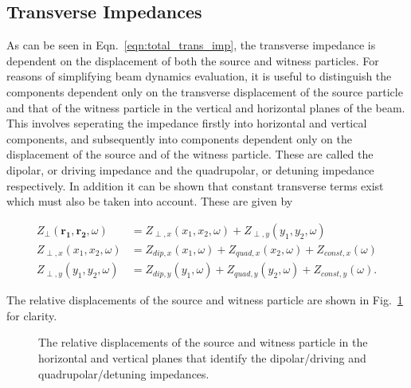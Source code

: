 \subsection{Transverse Impedances}

As can be seen in Eqn.~\ref{eqn:total_trans_imp}, the transverse impedance is dependent on the displacement of both the source and witness particles. For reasons of simplifying beam dynamics evaluation, it is useful to distinguish the components dependent only on the transverse displacement of the source particle and that of the witness particle in the vertical and horizontal planes of the beam. This involves seperating the impedance firstly into horizontal and vertical components, and subsequently into components dependent only on the displacement of the source and of the witness particle. These are called the dipolar, or driving impedance and the quadrupolar, or detuning impedance respectively. In addition it can be shown that constant transverse terms exist which must also be taken into account. These are given by

\begin{align}
Z_{\perp} \left(\mathbf{r_{1}}, \mathbf{r_{2}}, \omega  \right)  &= Z_{\perp, x} \left( x_{1}, x_{2}, \omega \right) + Z_{\perp, y} \left( y_{1}, y_{2}, \omega \right) \\
Z_{\perp, x} \left( x_{1}, x_{2}, \omega \right) &= Z_{dip, x} \left( x_{1}, \omega  \right) + Z_{quad, x} \left( x_{2}, \omega  \right) + Z_{const, x} \left( \omega  \right) \\
Z_{\perp, y} \left( y_{1}, y_{2}, \omega \right) &= Z_{dip, y} \left( y_{1}, \omega  \right) + Z_{quad, y} \left( y_{2}, \omega  \right) + Z_{const, y} \left( \omega  \right).
\end{align}

The relative displacements of the source and witness particle are shown in Fig.~\ref{fig:trans_imp_disp} for clarity.

\begin{figure}

\caption{The relative displacements of the source and witness particle in the horizontal and vertical planes that identify the dipolar/driving and quadrupolar/detuning impedances.}
\label{fig:trans_imp_disp}
\end{figure}

